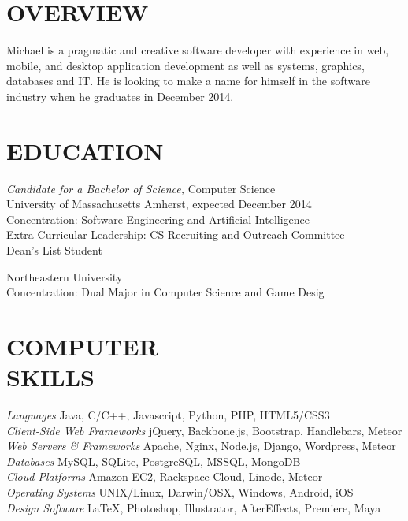 \documentclass[line,margin]{res}
\begin{document}
\address{169 Brittany Mnr Apt F, Amherst, MA 01002}
\address{(781) 264-6283  --  mike@miketurley.com -- github.com/mturley}

\begin{resume}
 
\section{OVERVIEW}
    Michael is a pragmatic and creative software developer with experience in web, mobile, and desktop application development as well as systems, graphics, databases and IT.  He is looking to make a name for himself in the software industry when he graduates in December 2014.
 
 
\section{EDUCATION}
    {\sl Candidate for a Bachelor of Science,} Computer Science \\
    University of Massachusetts Amherst, 
    expected December 2014 \\
    Concentration: Software Engineering and Artificial Intelligence \\
    Extra-Curricular Leadership: CS Recruiting and Outreach Committee \\
    Dean's List Student

    Northeastern University \\
    Concentration: Dual Major in Computer Science and Game Desig
 
 
\section{COMPUTER \\ SKILLS}
    {\sl Languages} \hfill Java, C/C++, Javascript, Python, PHP, HTML5/CSS3 \\
    {\sl Client-Side Web Frameworks} \hfill jQuery, Backbone.js, Bootstrap, Handlebars, Meteor \\
    {\sl Web Servers \& Frameworks} \hfill Apache, Nginx, Node.js, Django, Wordpress, Meteor \\
    {\sl Databases} \hfill MySQL, SQLite, PostgreSQL, MSSQL, MongoDB \\
    {\sl Cloud Platforms} \hfill Amazon EC2, Rackspace Cloud, Linode, Meteor \\
    {\sl Operating Systems} \hfill UNIX/Linux, Darwin/OSX, Windows, Android, iOS \\
    {\sl Design Software} \hfill \LaTeX, Photoshop, Illustrator, AfterEffects, Premiere, Maya
 

\end{resume}
\end{document}
